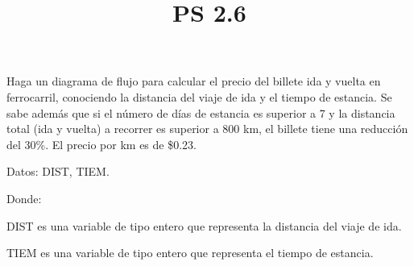 \documentclass[11pt]{amsart}
\title{PS 2.6}
\begin{document}
\maketitle
 \noindent  Haga un diagrama de flujo para calcular el precio del billete ida y vuelta en ferrocarril, conociendo la distancia del viaje de ida y el tiempo de estancia. Se sabe además que si el número de días de estancia es superior a 7 y la distancia total (ida y vuelta) a recorrer es superior a 800 km, el billete tiene una reducción del 30\%. El precio por km es de \$0.23. \newline

 \noindent Datos: \hspace{0.5cm} DIST, TIEM.
 
 \noindent Donde: 
 
 \setlength{\parindent}{1cm}
 DIST \hspace{0.5cm}  es una variable de tipo entero que representa la distancia del viaje de ida. 
 
 \setlength{\parindent}{1cm}
 TIEM \hspace{0.5cm} es una variable de tipo entero que representa el tiempo de estancia.
\end{document}
